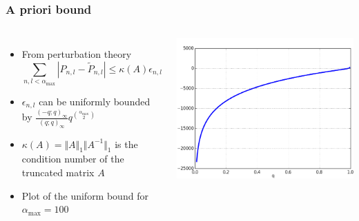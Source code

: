 \documentclass[table,aspectratio=169]{beamer}
\begin{document}
\begin{frame}[t]\frametitle{A priori bound}
    \begin{columns}
        \begin{itemize}
            \item From perturbation theory
            \[\sum_{n,l < \alpha_{\text{max}}} | P_{n,l} − \tilde{P}_{n,l} | \leq  \kappa(A) \epsilon_{n,l}\]
            \item $\epsilon_{n,l}$ can be uniformly bounded by $\frac{(-q;q)_\infty}{(q;q)_\infty}q^{\binom{\alpha_{\text{max}}}{2}}$
            \item $\kappa(A) = \Vert A \Vert_1 \Vert A^{-1} \Vert_1$ is the condition number of the truncated matrix $A$
            \item Plot of the uniform bound for $\alpha_{\text{max}}= 100$
        \end{itemize}
        \centering
        \includegraphics[width=.75\textwidth]{logBound1}
    \end{columns}
\end{frame}
\end{document}
